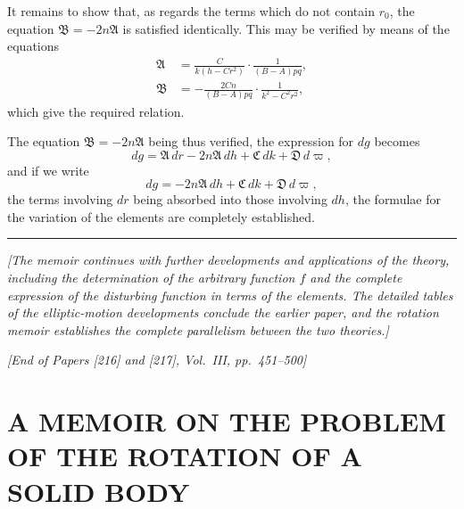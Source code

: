 \documentclass[11pt,a4paper]{book}
\begin{document}
It remains to show that, as regards the terms which do not contain $r_0$, the equation $\mathfrak{B} = -2n\mathfrak{A}$ is satisfied identically. This may be verified by means of the equations
\begin{align*}
\mathfrak{A} &= \frac{C}{k(h-Cr^2)} \cdot \frac{1}{(B-A)pq}, \\
\mathfrak{B} &= -\frac{2Cn}{(B-A)pq} \cdot \frac{1}{k^2-C^2r^2},
\end{align*}
which give the required relation.

The equation $\mathfrak{B} = -2n\mathfrak{A}$ being thus verified, the expression for $dg$ becomes
\[
dg = \mathfrak{A} \, dr - 2n\mathfrak{A} \, dh + \mathfrak{C} \, dk + \mathfrak{D} \, d\varpi,
\]
and if we write
\[
dg = -2n\mathfrak{A} \, dh + \mathfrak{C} \, dk + \mathfrak{D} \, d\varpi,
\]
the terms involving $dr$ being absorbed into those involving $dh$, the formulae for the variation of the elements are completely established.

\vspace{2em}

\begin{center}
\rule{0.5\textwidth}{0.4pt}
\end{center}

\vspace{1em}

\noindent\textit{[The memoir continues with further developments and applications of the theory, including the determination of the arbitrary function $f$ and the complete expression of the disturbing function in terms of the elements. The detailed tables of the elliptic-motion developments conclude the earlier paper, and the rotation memoir establishes the complete parallelism between the two theories.]}

\vspace{2em}

\begin{flushright}
\textit{[End of Papers [216] and [217], Vol.~III, pp.~451--500]}
\end{flushright}
\clearpage


\thispagestyle{empty}

\section{A MEMOIR ON THE PROBLEM OF THE ROTATION OF A SOLID BODY}
\end{document}
